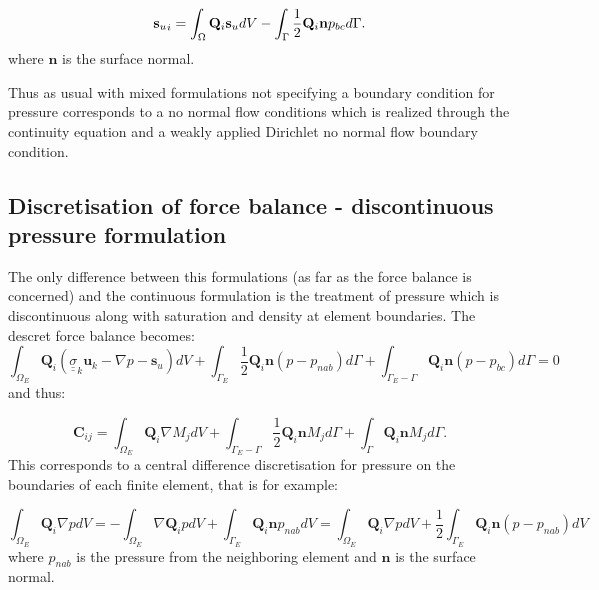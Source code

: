 \begin{equation}
{{\bf s}_u}_i= \int_\Omega {\mathbf Q}_i {\mathbf s}_u dV 
- \int_\Gamma \frac{1}{2}{\mathbf Q}_i {\mathbf n} p_{bc} d\Gamma. 
\end{equation}
where ${\mathbf n}$ is the surface normal. 

Thus as usual with mixed formulations not specifying a 
boundary condition for pressure corresponds to a no 
normal flow conditions which is realized through the continuity 
equation and a weakly applied Dirichlet no normal 
flow boundary condition. 



\subsection{Discretisation of force balance - discontinuous pressure formulation} 

The only difference between this formulations (as far as the force balance 
is concerned) and the continuous formulation is the treatment of pressure 
which is discontinuous along with saturation and density at element 
boundaries. The descret force balance becomes:
\begin{equation}
\int_{\Omega_E} {\mathbf Q}_i ( {\underline {\underline \sigma}}_k 
{\mathbf u}_k - \nabla p -{\mathbf s}_u) dV 
+  \int_{\Gamma_{E}} \frac{1}{2}{\mathbf Q}_i {\mathbf n} (p - p_{nab}) d\Gamma 
+  \int_{\Gamma_{E}-\Gamma} {\mathbf Q}_i {\mathbf n} (p - p_{bc}) d\Gamma =0
\end{equation}
and thus: 

\begin{equation}
{\mathbf C}_{ij}=\int_{\Omega_E} {\mathbf Q}_i \nabla M_j dV 
+ \int_{\Gamma_{E}-\Gamma} \frac{1}{2}{\mathbf Q}_i {\mathbf n} M_j d\Gamma 
+ \int_\Gamma {\mathbf Q}_i {\mathbf n} M_j d\Gamma .
\end{equation}
This corresponds to a central difference discretisation for pressure 
on the boundaries of each finite element, that is for example:

\begin{equation}
\int_{\Omega_E} {\mathbf Q}_i \nabla p dV = -\int_{\Omega_E} \nabla {\mathbf Q}_i  p dV 
+ \int_{\Gamma_E} {\mathbf Q}_i {\mathbf n} p_{nab} dV 
= \int_{\Omega_E} {\mathbf Q}_i \nabla p dV 
+ \frac{1}{2} \int_{\Gamma_E} {\mathbf Q}_i {\mathbf n} (p-p_{nab}) dV
\label{dg-sat-form}
\end{equation}
where $p_{nab}$ is the pressure from the neighboring 
element and ${\mathbf n}$ is the surface normal. 


